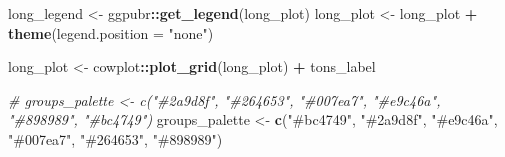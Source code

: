 \documentclass[
]{book}
\newenvironment{Shaded}{\begin{snugshade}}{\end{snugshade}}
\newcommand{\AttributeTok}[1]{\textcolor[rgb]{0.13,0.29,0.53}{#1}}
\newcommand{\CommentTok}[1]{\textcolor[rgb]{0.56,0.35,0.01}{\textit{#1}}}
\newcommand{\FunctionTok}[1]{\textcolor[rgb]{0.13,0.29,0.53}{\textbf{#1}}}
\newcommand{\NormalTok}[1]{#1}
\newcommand{\OtherTok}[1]{\textcolor[rgb]{0.56,0.35,0.01}{#1}}
\newcommand{\SpecialCharTok}[1]{\textcolor[rgb]{0.81,0.36,0.00}{\textbf{#1}}}
\newcommand{\StringTok}[1]{\textcolor[rgb]{0.31,0.60,0.02}{#1}}
\begin{document}
\begin{Shaded}
\begin{Highlighting}[]
\NormalTok{long\_legend }\OtherTok{\textless{}{-}}\NormalTok{ ggpubr}\SpecialCharTok{::}\FunctionTok{get\_legend}\NormalTok{(long\_plot)}
\NormalTok{long\_plot }\OtherTok{\textless{}{-}}\NormalTok{ long\_plot }\SpecialCharTok{+}
  \FunctionTok{theme}\NormalTok{(}\AttributeTok{legend.position =} \StringTok{"none"}\NormalTok{)}

\NormalTok{long\_plot }\OtherTok{\textless{}{-}}\NormalTok{ cowplot}\SpecialCharTok{::}\FunctionTok{plot\_grid}\NormalTok{(long\_plot) }\SpecialCharTok{+}\NormalTok{ tons\_label}


\CommentTok{\# groups\_palette \textless{}{-} c("\#2a9d8f", "\#264653", "\#007ea7", "\#e9c46a", "\#898989", "\#bc4749")}
\NormalTok{groups\_palette }\OtherTok{\textless{}{-}} \FunctionTok{c}\NormalTok{(}\StringTok{"\#bc4749"}\NormalTok{, }\StringTok{"\#2a9d8f"}\NormalTok{, }\StringTok{"\#e9c46a"}\NormalTok{, }\StringTok{"\#007ea7"}\NormalTok{, }\StringTok{"\#264653"}\NormalTok{, }\StringTok{"\#898989"}\NormalTok{)}



\end{Highlighting}
\end{Shaded}
\end{document}
